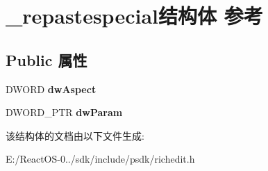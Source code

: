 \hypertarget{struct__repastespecial}{}\section{\+\_\+repastespecial结构体 参考}
\label{struct__repastespecial}
\subsection*{Public 属性}
\begin{DoxyCompactItemize}
\item 
\mbox{\label{struct__repastespecial_a6f8f6ad6f78a49c8478bbb76513431da}} 
D\+W\+O\+RD {\bfseries dw\+Aspect}
\item 
\mbox{\label{struct__repastespecial_ad2166f95ed02510147381e5904d35297}} 
D\+W\+O\+R\+D\+\_\+\+P\+TR {\bfseries dw\+Param}
\end{DoxyCompactItemize}


该结构体的文档由以下文件生成\+:\begin{DoxyCompactItemize}
\item 
E\+:/\+React\+O\+S-\/0../sdk/include/psdk/richedit.\+h\end{DoxyCompactItemize}
